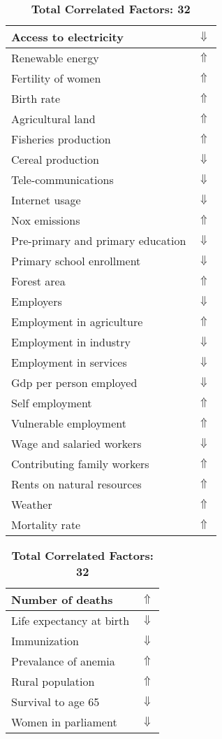 \documentclass[12pt,notitlepage,oneside]{report}
\begin{document}
\begin{table}[!htb]
\caption{\textbf{Specific Disease Is: Dengue fever $\Uparrow$}}
\centering
\label{Correlated Socio-economic Factors0}
\begin{tabular}{|l|l|}
\hline
Access to electricity & $\Downarrow$\\ \hline
Renewable energy & $\Uparrow$\\ \hline
Fertility of women & $\Uparrow$\\ \hline
Birth rate & $\Uparrow$\\ \hline
Agricultural land & $\Uparrow$\\ \hline
Fisheries production & $\Uparrow$\\ \hline
Cereal production & $\Downarrow$\\ \hline
Tele-communications & $\Downarrow$\\ \hline
Internet usage & $\Downarrow$\\ \hline
Nox emissions & $\Uparrow$\\ \hline
Pre-primary and primary education & $\Downarrow$\\ \hline
Primary school enrollment & $\Downarrow$\\ \hline
Forest area & $\Uparrow$\\ \hline
Employers & $\Downarrow$\\ \hline
Employment in agriculture & $\Uparrow$\\ \hline
Employment in industry & $\Downarrow$\\ \hline
Employment in services & $\Downarrow$\\ \hline
Gdp per person employed & $\Downarrow$\\ \hline
Self employment & $\Uparrow$\\ \hline
Vulnerable employment & $\Uparrow$\\ \hline
Wage and salaried workers & $\Downarrow$\\ \hline
Contributing family workers & $\Uparrow$\\ \hline
Rents on natural resources & $\Uparrow$\\ \hline
Weather & $\Uparrow$\\ \hline
Mortality rate & $\Uparrow$\\ \hline
\end{tabular}
\begin{tabular}{|l|l|}
\hline
Number of deaths & $\Uparrow$\\ \hline
Life expectancy at birth & $\Downarrow$\\ \hline
Immunization & $\Downarrow$\\ \hline
Prevalance of anemia & $\Uparrow$\\ \hline
Rural population & $\Uparrow$\\ \hline
Survival to age 65 & $\Downarrow$\\ \hline
Women in parliament & $\Downarrow$\\ \hline
\end{tabular}
\caption*{\textbf{Total Correlated Factors: 32}}
\end{table}
\end{document}
